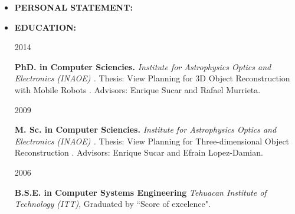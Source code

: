 \documentclass[10pt]{article}
\begin{document}
\begin{itemize}

\item{\bf PERSONAL STATEMENT:}
	

	
\item{\bf EDUCATION:}

\begin{minipage}{1.5 in}
	2014\\
\end{minipage}
\begin{minipage}{4.5in}
	\textbf{PhD. in Computer Sciencies.} \textit{Institute for Astrophysics Optics and
	Electronics (INAOE) \href{https://www.inaoep.mx/}{\faExternalLink}.} Thesis: View Planning for 3D Object Reconstruction with Mobile Robots \href{https://jivasquez.files.wordpress.com/2015/03/tesis-doctorado.pdf}{\faFilePdfO}. Advisors: Enrique Sucar and Rafael Murrieta.\\ 
\end{minipage}


\begin{minipage}{1.5 in}
	2009\\
\end{minipage}
\begin{minipage}{4.5in}
	\textbf{M. Sc. in Computer Sciencies.} \textit{Institute for Astrophysics Optics and
		Electronics (INAOE) \href{https://www.inaoep.mx/}{\faExternalLink}.} Thesis: View Planning for Three-dimensional Object Reconstruction \href{https://jivasquez.files.wordpress.com/2015/03/tesis-maestria.pdf}{\faFilePdfO}. Advisors: Enrique Sucar and Efrain Lopez-Damian.\\ 
\end{minipage}

\begin{minipage}{1.5 in}
	2006\\
\end{minipage}
\begin{minipage}{4.5in}
	\textbf{B.S.E. in Computer Systems Engineering} \textit{Tehuacan Institute of Technology (ITT)}, Graduated by ``Score of excelence".\\ 
\end{minipage}


\end{itemize}
\end{document}
